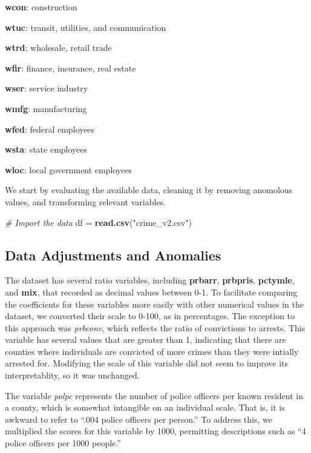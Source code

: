 \documentclass[]{article}
\newenvironment{Shaded}{\begin{snugshade}}{\end{snugshade}}
\newcommand{\KeywordTok}[1]{\textcolor[rgb]{0.13,0.29,0.53}{\textbf{#1}}}
\newcommand{\StringTok}[1]{\textcolor[rgb]{0.31,0.60,0.02}{#1}}
\newcommand{\CommentTok}[1]{\textcolor[rgb]{0.56,0.35,0.01}{\textit{#1}}}
\newcommand{\NormalTok}[1]{#1}
\begin{document}
\textbf{wcon}: construction

\textbf{wtuc}: transit, utilities, and communication

\textbf{wtrd}: wholesale, retail trade

\textbf{wfir}: finance, insurance, real estate

\textbf{wser}: service industry

\textbf{wmfg}: manufacturing

\textbf{wfed}: federal employees

\textbf{wsta}: state employees

\textbf{wloc}: local government employees

We start by evaluating the available data, cleaning it by removing
anomolous values, and transforming relevant variables.

\begin{Shaded}
\begin{Highlighting}[]
\CommentTok{# Import the data}
\NormalTok{df =}\StringTok{ }\KeywordTok{read.csv}\NormalTok{(}\StringTok{"crime_v2.csv"}\NormalTok{)}
\end{Highlighting}
\end{Shaded}

\subsection{Data Adjustments and
Anomalies}\label{data-adjustments-and-anomalies}

The dataset has several ratio variables, including \textbf{prbarr},
\textbf{prbpris}, \textbf{pctymle}, and \textbf{mix}, that recorded as
decimal values between 0-1. To facilitate comparing the coefficients for
these variables more easily with other numerical values in the dataset,
we converted their scale to 0-100, as in percentages. The exception to
this approach was \emph{prbconv}, which reflects the ratio of
convictions to arrests. This variable has several values that are
greater than 1, indicating that there are counties where individuals are
convicted of more crimes than they were intially arrested for. Modifying
the scale of this variable did not seem to improve its interpretablity,
so it was unchanged.

The variable \emph{polpc} represents the number of police officers per
known resident in a county, which is somewhat intangible on an
individual scale. That is, it is awkward to refer to ``.004 police
officers per person.'' To address this, we multiplied the scores for
this variable by 1000, permitting descriptions such as ``4 police
officers per 1000 people.''
\end{document}
